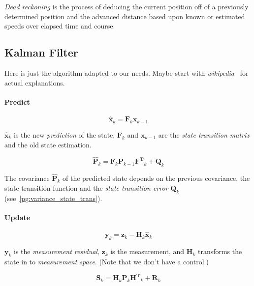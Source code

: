 \documentclass[a4paper, 12pt]{paper}
\begin{document}
\emph{Dead reckoning} is the process of deducing the current position off of a
previously determined position and the advanced distance based upon known or
estimated speeds over elapsed time and course.~\cite{wikipedia_dead_reckoning}

\subsection{Kalman Filter}

Here is just the algorithm adapted to our needs. Maybe start with
\emph{wikipedia}~\cite{wikipedia_lqe} for actual explanations.

\paragraph{Predict}

\begin{equation}
    \mathbf{\hat{x}}_k = \mathbf{F}_k \mathbf{{x}}_{k-1}
\label{eq:state_predict}
\end{equation}

$\mathbf{\hat{x}}_k$ is the new \emph{prediction} of the state,
$\mathbf{F}_k$ and $\mathbf{{x}}_{k-1}$ are the \emph{state transition matrix}
and the old state estimation.

\begin{equation}
    \mathbf{\hat P}_k = \mathbf{F}_k \mathbf{P}_{k-1} \mathbf{F^T}_k + \mathbf{Q}_k
\label{eq:cov_predict}
\end{equation}

The covariance $\mathbf{\hat P}_k$ of the predicted state depends on the previous
covariance, the state transition function and the \emph{state transition error}
$\mathbf{Q}_k$ (see~\ref{pg:variance_state_trans}).

\paragraph{Update}

\begin{equation}
    \mathbf{y}_k = \mathbf{z}_k - \mathbf{H}_k \mathbf{\hat x}_k
\label{eq:measurement_residual}
\end{equation}

$\mathbf{y}_k$ is the \emph{measurement residual}, $\mathbf{z}_k$ is the measurement,
and $\mathbf{H}_k$ transforms the state in to \emph{measurement space}. (Note that
we don't have a control.)

\begin{equation}
    \mathbf{S}_k = \mathbf{H}_k \mathbf{P}_k \mathbf{H^T}_k + \mathbf{R}_k
\label{eq:residual_cov}
\end{equation}
\end{document}
